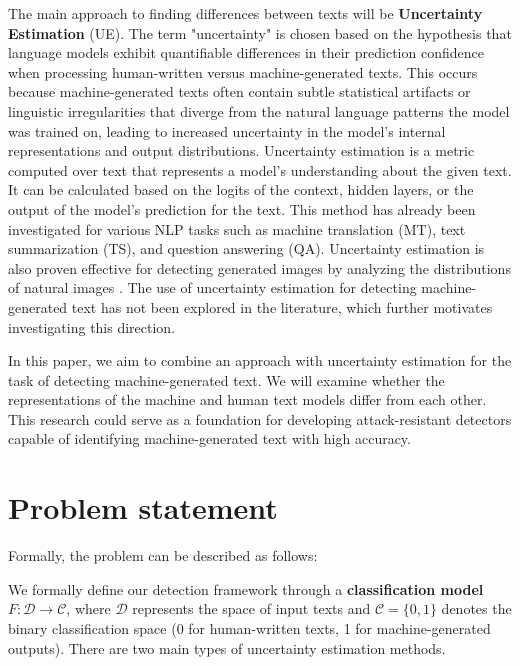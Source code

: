 \documentclass[a4paper, 12pt]{article}
\begin{document}
The main approach to finding differences between texts will be \textbf{Uncertainty Estimation} (UE). The term "uncertainty" is chosen based on the hypothesis that language models exhibit quantifiable differences in their prediction confidence when processing human-written versus machine-generated texts. This occurs because machine-generated texts often contain subtle statistical artifacts or linguistic irregularities that diverge from the natural language patterns the model was trained on, leading to increased uncertainty in the model's internal representations and output distributions. Uncertainty estimation is a metric computed over text that represents a model’s understanding about the given text. It can be calculated based on the logits of the context, hidden layers, or the output of the model’s prediction for the text. This method has already been investigated for various NLP tasks such as machine translation (MT), text summarization (TS), and question answering (QA)\citep{Polygraph}. Uncertainty estimation is also proven effective for detecting generated images by analyzing the distributions of natural images \citep{Image_uncertainty}. The use of uncertainty estimation for detecting machine-generated text has not been explored in the literature, which further motivates investigating this direction.

In this paper, we aim to combine an approach with uncertainty estimation for the task of detecting machine-generated text. We will examine whether the representations of the machine and human text models differ from each other. This research could serve as a foundation for developing attack-resistant detectors capable of identifying machine-generated text with high accuracy.

\section{Problem statement}

Formally, the problem can be described as follows:  

We formally define our detection framework through a \textbf{classification model} \( F: \mathcal{D} \rightarrow \mathcal{C} \), where \(\mathcal{D}\) represents the space of input texts and \(\mathcal{C} = \{0,1\}\) denotes the binary classification space (0 for human-written texts, 1 for machine-generated outputs). There are two main types of uncertainty estimation methods.
\end{document}
